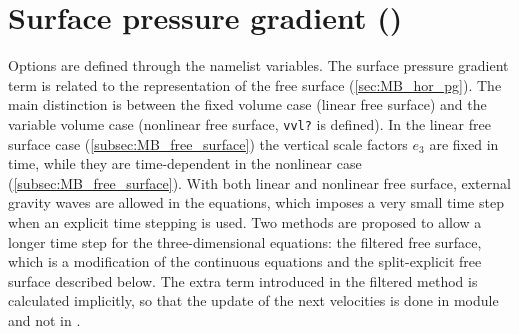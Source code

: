\documentclass[../main/NEMO_manual]{subfiles}
\begin{document}
\section[Surface pressure gradient (\textit{dynspg.F90})]{Surface pressure gradient (\protect{})}
\label{sec:DYN_spg}

\begin{listing}
  \caption{}
  \label{lst:namdyn_spg}
\end{listing}

Options are defined through the  namelist variables.
The surface pressure gradient term is related to the representation of the free surface (\autoref{sec:MB_hor_pg}).
The main distinction is between the fixed volume case (linear free surface) and
the variable volume case (nonlinear free surface, \texttt{vvl?} is defined).
In the linear free surface case (\autoref{subsec:MB_free_surface})
the vertical scale factors $e_{3}$ are fixed in time,
while they are time-dependent in the nonlinear case (\autoref{subsec:MB_free_surface}).
With both linear and nonlinear free surface, external gravity waves are allowed in the equations,
which imposes a very small time step when an explicit time stepping is used.
Two methods are proposed to allow a longer time step for the three-dimensional equations:
the filtered free surface, which is a modification of the continuous equations \iffalse (see \autoref{eq:MB_flt?}) \fi
and the split-explicit free surface described below.
The extra term introduced in the filtered method is calculated implicitly,
so that the update of the next velocities is done in module  and not in .
\end{document}
